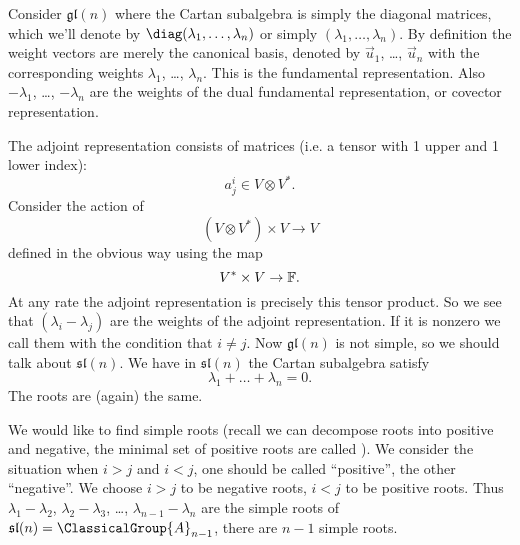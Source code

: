 Consider $\mathfrak{gl}(n)$ where the Cartan subalgebra is simply
the diagonal matrices, which we'll denote by $\diag(\lambda_{1},\dots,\lambda_{n})$
or simply $(\lambda_{1},\dots,\lambda_{n})$. By definition the
weight vectors are merely the canonical basis, denoted by
$\vec{u}_{1}$, \dots, $\vec{u}_{n}$ with the corresponding
weights $\lambda_{1}$, \dots, $\lambda_{n}$. This is the
fundamental representation. Also $-\lambda_{1}$, \dots,
$-\lambda_{n}$ are the weights of the dual fundamental
representation, or covector representation.

The adjoint representation consists of matrices (i.e. a tensor
with 1 upper and 1 lower index):
\begin{equation}
a^{i}_{j}\in V\otimes V^{*}.
\end{equation}
Consider the action of
\begin{equation}
(V\otimes V^{*})\times V\to V
\end{equation}
defined in the obvious way using the map
\begin{equation}
V^{*}\times V\to\Bbb{F}.
\end{equation}
At any rate the adjoint representation is precisely this tensor
product. So we see that $(\lambda_{i}-\lambda_{j})$ are the
weights of the adjoint representation. If it is nonzero we call
them  with the condition that $i\not=j$. Now
$\mathfrak{gl}(n)$ is not simple, so we should talk about
$\mathfrak{sl}(n)$. We have in $\mathfrak{sl}(n)$ the Cartan
subalgebra satisfy
\begin{equation}
\lambda_{1}+\dots+\lambda_{n}=0.
\end{equation}
The roots are (again) the same.

We would like to find simple roots (recall we can decompose roots
into positive and negative, the minimal set of positive roots are
called ). We consider the situation when
$i>j$ and $i<j$, one should be called ``positive'', the other
``negative''. We choose $i>j$ to be negative roots, $i<j$ to be
positive roots. Thus $\lambda_{1}-\lambda_{2}$,
$\lambda_{2}-\lambda_{3}$, \dots, $\lambda_{n-1}-\lambda_{n}$ are
the simple roots of $\mathfrak{sl}(n)=\ClassicalGroup{A}_{n-1}$,
there are $n-1$ simple roots.

